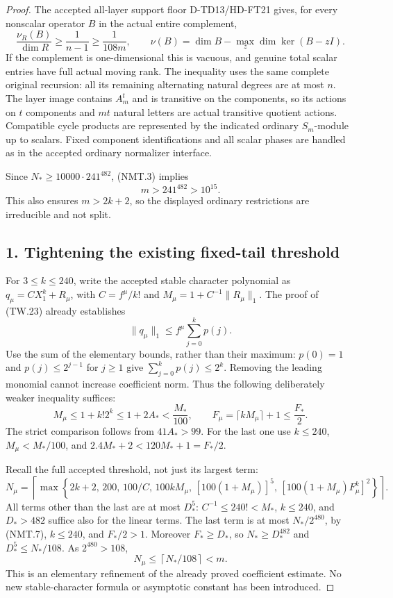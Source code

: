 \begin{proof}
The accepted all-layer support floor D-TD13/HD-FT21 gives, for
every nonscalar operator $B$ in the actual entire complement,
\[
 \frac{\nu_R(B)}{\dim R}\ge\frac1{n-1}\ge\frac1{108m},
 \qquad
 \nu(B)=\dim B-\max_z\dim\ker(B-zI).
 \tag{NMT.4}
\]
If the complement is one-dimensional this is vacuous, and genuine
total scalar entries have full actual moving rank.  The inequality
uses the same complete original recursion: all its remaining
alternating natural degrees are at most $n$.  The layer image
contains $A_m^t$ and is transitive on the components, so its
actions on $t$ components and $mt$ natural letters are actual
transitive quotient actions.  Compatible cycle products are
represented by the indicated ordinary $S_m$-module up to scalars.
Fixed component identifications and all scalar phases are handled
as in the accepted ordinary normalizer interface.

Since $N_*\ge10000\cdot241^{482}$, (NMT.3) implies
\[
                       m>241^{482}>10^{15}.
 \tag{NMT.5}
\]
This also ensures $m>2k+2$, so the displayed ordinary restrictions
are irreducible and not split.

\subsection*{1. Tightening the existing fixed-tail threshold}

For $3\le k\le240$, write the accepted stable character polynomial
as $q_\mu=CX_1^k+R_\mu$, with
$C=f^\mu/k!$ and
$M_\mu=1+C^{-1}\|R_\mu\|_1$.
The proof of (TW.23) already establishes
\[
 \|q_\mu\|_1\le f^\mu\sum_{j=0}^kp(j).
 \tag{NMT.6}
\]
Use the sum of the elementary bounds, rather than their maximum:
$p(0)=1$ and $p(j)\le2^{j-1}$ for $j\ge1$ give
$\sum_{j=0}^kp(j)\le2^k$.
Removing the leading monomial cannot increase coefficient norm.
Thus the following deliberately weaker inequality suffices:
\[
 M_\mu\le1+k!2^k\le1+2A_*<\frac{M_*}{100},
 \qquad
 F_\mu=\lceil kM_\mu\rceil+1\le\frac{F_*}{2}.
 \tag{NMT.7}
\]
The strict comparison follows from $41A_*>99$.
For the last one use $k\le240$, $M_\mu<M_*/100$, and
$2.4M_*+2<120M_*+1=F_*/2$.

Recall the full accepted threshold, not just its largest term:
\[
 N_\mu=\left\lceil\max\left\{
 2k+2,\,200,\,100/C,\,100kM_\mu,\,
 [100(1+M_\mu)]^5,\,
 [100(1+M_\mu)F_\mu^k]^2\right\}\right\rceil.
 \tag{NMT.8}
\]
All terms other than the last are at most $D_*^5$:
$C^{-1}\le240!<M_*$, $k\le240$, and $D_*>482$ suffice
also for the linear terms.  The last term is at most
$N_*/2^{480}$, by (NMT.7), $k\le240$, and $F_*/2>1$.
Moreover $F_*\ge D_*$, so
$N_*\ge D_*^{482}$ and $D_*^5\le N_*/108$.
As $2^{480}>108$,
\[
                    N_\mu\le\left\lceil N_*/108\right\rceil<m.
 \tag{NMT.9}
\]
This is an elementary refinement of the already proved coefficient
estimate.  No new stable-character formula or asymptotic constant
has been introduced.


\end{proof}
